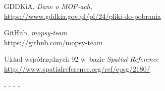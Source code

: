 \begin{thebibliography}{99}
 GDDKiA, \textit{Dane o MOP-ach}, \\ \url{https://www.gddkia.gov.pl/pl/24/pliki-do-pobrania}

 GitHub, \textit{mopsy-team} \\ \url{https://github.com/mopsy-team}

 Układ współrzędnych 92 w~bazie \textit{Spatial Reference} \\ \url{http://www.spatialreference.org/ref/epsg/2180/}
\end{thebibliography}



-%
-%
-%
-%
